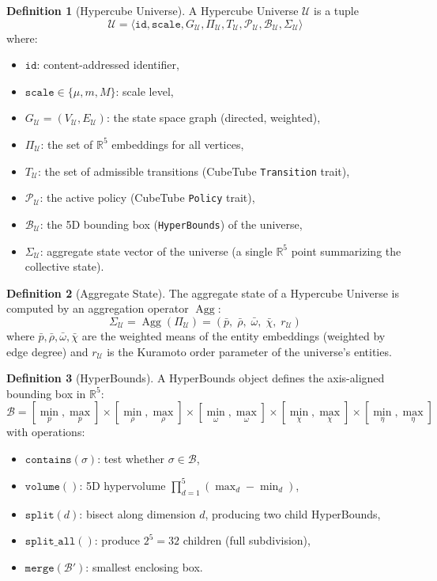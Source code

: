 \documentclass[11pt,a4paper,twoside]{article}
\theoremstyle{definition}
\newtheorem{definition}{Definition}[section]
\theoremstyle{plain}
\theoremstyle{remark}
\newcommand{\RR}{\mathbb{R}}
\newcommand{\calP}{\mathcal{P}}
\newcommand{\calB}{\mathcal{B}}
\newcommand{\calU}{\mathcal{U}}
\DeclareMathOperator{\Agg}{Agg}
\begin{document}
\begin{definition}[Hypercube Universe]\label{def:universe}
A Hypercube Universe $\calU$ is a tuple
\[
  \calU = \langle \mathtt{id}, \mathtt{scale}, G_\calU, \Pi_\calU,
          T_\calU, \calP_\calU, \calB_\calU, \Sigma_\calU \rangle
\]
where:
\begin{itemize}[nosep]
  \item $\mathtt{id}$: content-addressed identifier,
  \item $\mathtt{scale} \in \{\mu, m, M\}$: scale level,
  \item $G_\calU = (V_\calU, E_\calU)$: the state space graph (directed,
        weighted),
  \item $\Pi_\calU$: the set of $\RR^5$ embeddings for all vertices,
  \item $T_\calU$: the set of admissible transitions (CubeTube
        \texttt{Transition} trait),
  \item $\calP_\calU$: the active policy (CubeTube \texttt{Policy}
        trait),
  \item $\calB_\calU$: the 5D bounding box (\texttt{HyperBounds}) of
        the universe,
  \item $\Sigma_\calU$: aggregate state vector of the universe (a single
        $\RR^5$ point summarizing the collective state).
\end{itemize}
\end{definition}

\begin{definition}[Aggregate State]\label{def:aggstate}
The aggregate state of a Hypercube Universe is computed by an
aggregation operator $\Agg$:
\[
  \Sigma_\calU = \Agg(\Pi_\calU) =
  \left(
    \bar{p},\; \bar{\rho},\; \bar{\omega},\; \bar{\chi},\; r_\calU
  \right)
\]
where $\bar{p}, \bar{\rho}, \bar{\omega}, \bar{\chi}$ are the
weighted means of the entity embeddings (weighted by edge degree) and
$r_\calU$ is the Kuramoto order parameter of the universe's entities.
\end{definition}

\begin{definition}[HyperBounds]\label{def:hyperbounds}
A HyperBounds object defines the axis-aligned bounding box in $\RR^5$:
\[
  \calB = [\min_p, \max_p] \times [\min_\rho, \max_\rho] \times
          [\min_\omega, \max_\omega] \times [\min_\chi, \max_\chi] \times
          [\min_\eta, \max_\eta]
\]
with operations:
\begin{itemize}[nosep]
  \item $\mathtt{contains}(\sigma)$: test whether $\sigma \in \calB$,
  \item $\mathtt{volume}()$: 5D hypervolume
        $\prod_{d=1}^{5}(\max_d - \min_d)$,
  \item $\mathtt{split}(d)$: bisect along dimension $d$, producing two
        child HyperBounds,
  \item $\mathtt{split\_all}()$: produce $2^5 = 32$ children (full
        subdivision),
  \item $\mathtt{merge}(\calB')$: smallest enclosing box.
\end{itemize}
\end{definition}
\end{document}
